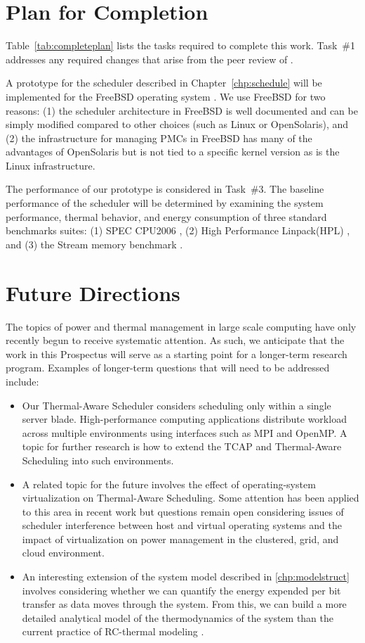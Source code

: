 \section{Plan for Completion}
\label{sec:completionplans}
Table~\ref{tab:completeplan} lists the tasks required to complete this
work.  Task~\#1 addresses any required changes that arise from the peer
review of \cite{Lewis2011}.   

A prototype for the scheduler described in Chapter~\ref{chp:schedule}
will be implemented for the FreeBSD operating system
\cite{McKusick2004}.  We use FreeBSD for two reasons: (1) the scheduler
architecture in FreeBSD is well documented and can be simply modified
compared to other choices (such as Linux or OpenSolaris), and (2) the
infrastructure for managing PMCs in FreeBSD has many of the advantages
of OpenSolaris but is not tied to a specific kernel version as is the
Linux infrastructure.

The performance of our prototype is considered in Task~\#3.  The
baseline performance of the scheduler will be determined by examining
the system performance, thermal behavior, and energy consumption of
three standard benchmarks suites: (1) SPEC CPU2006 \cite{spec2006}, (2)
High Performance Linpack(HPL) \cite{Linpack1991}, and (3) the Stream
memory benchmark \cite{McCalpin1995}.  

\section{Future Directions}
\label{sec:future-directions}
The topics of power and thermal management in large scale computing have
only recently begun to receive systematic attention.  As such, we
anticipate that the work in this Prospectus will serve as a starting
point for a longer-term research program.   Examples of longer-term
questions that will need to be addressed include:
\begin{itemize}
\item Our Thermal-Aware Scheduler considers scheduling only within a single
  server blade. High-performance computing applications distribute
  workload across multiple environments using interfaces such as MPI and
  OpenMP.  A topic for further research is how to extend the TCAP and
  Thermal-Aware Scheduling into such environments.
\item A related topic for the future involves the effect of
  operating-system virtualization on Thermal-Aware Scheduling.  Some
  attention has been applied to this area in recent work
  \cite{Merkel2010} but questions remain open considering issues of
  scheduler interference between host and virtual operating systems and
  the impact of virtualization on power management in the clustered,
  grid, and cloud environment.
\item An interesting extension of the system model described in
  \ref{chp:modelstruct} involves considering whether we can quantify the
  energy expended per bit transfer as data moves through the
  system. From this, we can build a more detailed analytical model of
  the thermodynamics of the system than the current practice of
  RC-thermal modeling \cite{Skadron2004}.  
\end{itemize}

